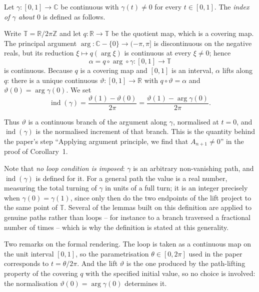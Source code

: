 \begin{definition}
Let $\gamma\colon[0,1]\to\mathbb{C}$ be continuous with $\gamma(t)\neq0$ for
every $t\in[0,1]$.  The \emph{index of $\gamma$ about $0$} is defined as
follows.

Write $\mathbb{T}=\mathbb{R}/2\pi\mathbb{Z}$ and let
$q\colon\mathbb{R}\to\mathbb{T}$ be the quotient map, which is a covering map.
The principal argument $\arg\colon\mathbb{C}-\{0\}\to(-\pi,\pi]$ is
discontinuous on the negative reals, but its reduction
$\xi\mapsto q(\arg\xi)$ is continuous at every $\xi\neq0$; hence
\[
  \alpha=q\circ\arg\circ\gamma\colon[0,1]\to\mathbb{T}
\]
is continuous.  Because $q$ is a covering map and $[0,1]$ is an interval,
$\alpha$ lifts along $q$: there is a unique continuous
$\vartheta\colon[0,1]\to\mathbb{R}$ with $q\circ\vartheta=\alpha$ and
$\vartheta(0)=\arg\gamma(0)$.  We set
\[
  \operatorname{ind}(\gamma)=\frac{\vartheta(1)-\vartheta(0)}{2\pi}
  =\frac{\vartheta(1)-\arg\gamma(0)}{2\pi}.
\]

Thus $\vartheta$ is a continuous branch of the argument along $\gamma$, normalised
at $t=0$, and $\operatorname{ind}(\gamma)$ is the normalised increment of that
branch.  This is the quantity behind the paper's step ``Applying argument
principle, we find that $A_{n+1}\neq0$'' in the proof of Corollary~1.

Note that \emph{no loop condition is imposed}: $\gamma$ is an arbitrary
non-vanishing path, and $\operatorname{ind}(\gamma)$ is defined for it.  For a
general path the value is a real number, measuring the total turning of
$\gamma$ in units of a full turn; it is an integer precisely when
$\gamma(0)=\gamma(1)$, since only then do the two endpoints of the lift project
to the same point of $\mathbb{T}$.  Several of the lemmas built on this
definition are applied to genuine paths rather than loops -- for instance to a
branch traversed a fractional number of times -- which is why the definition is
stated at this generality.

Two remarks on the formal rendering.  The loop is taken as a continuous map on
the unit interval $[0,1]$, so the parametrisation $\theta\in[0,2\pi]$ used in
the paper corresponds to $t=\theta/2\pi$.  And the lift $\vartheta$ is the one
produced by the path-lifting property of the covering $q$ with the specified
initial value, so no choice is involved: the normalisation
$\vartheta(0)=\arg\gamma(0)$ determines it.
\end{definition}
